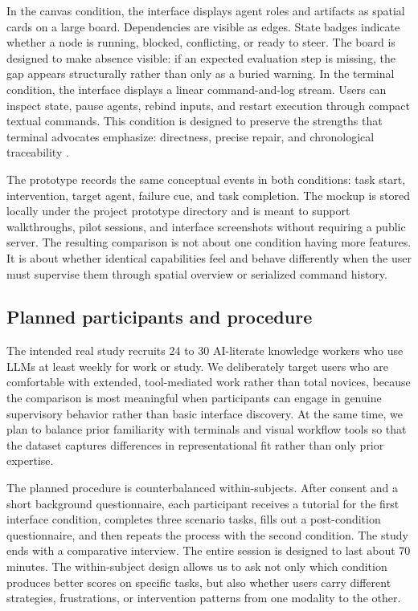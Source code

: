 \documentclass[sigconf]{acmart}
\begin{document}
In the canvas condition, the interface displays agent roles and artifacts as spatial cards on a large board. Dependencies are visible as edges. State badges indicate whether a node is running, blocked, conflicting, or ready to steer. The board is designed to make absence visible: if an expected evaluation step is missing, the gap appears structurally rather than only as a buried warning. In the terminal condition, the interface displays a linear command-and-log stream. Users can inspect state, pause agents, rebind inputs, and restart execution through compact textual commands. This condition is designed to preserve the strengths that terminal advocates emphasize: directness, precise repair, and chronological traceability \cite{demasi2026terminal}.

The prototype records the same conceptual events in both conditions: task start, intervention, target agent, failure cue, and task completion. The mockup is stored locally under the project prototype directory and is meant to support walkthroughs, pilot sessions, and interface screenshots without requiring a public server. The resulting comparison is not about one condition having more features. It is about whether identical capabilities feel and behave differently when the user must supervise them through spatial overview or serialized command history.

\subsection{Planned participants and procedure}

The intended real study recruits 24 to 30 AI-literate knowledge workers who use LLMs at least weekly for work or study. We deliberately target users who are comfortable with extended, tool-mediated work rather than total novices, because the comparison is most meaningful when participants can engage in genuine supervisory behavior rather than basic interface discovery. At the same time, we plan to balance prior familiarity with terminals and visual workflow tools so that the dataset captures differences in representational fit rather than only prior expertise.

The planned procedure is counterbalanced within-subjects. After consent and a short background questionnaire, each participant receives a tutorial for the first interface condition, completes three scenario tasks, fills out a post-condition questionnaire, and then repeats the process with the second condition. The study ends with a comparative interview. The entire session is designed to last about 70 minutes. The within-subject design allows us to ask not only which condition produces better scores on specific tasks, but also whether users carry different strategies, frustrations, or intervention patterns from one modality to the other.
\end{document}
